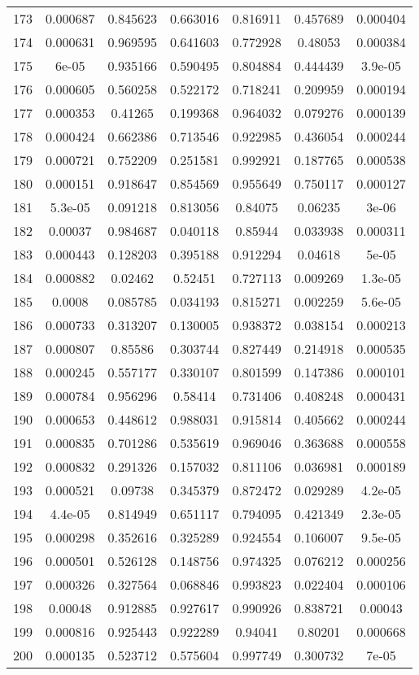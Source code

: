 \begin{table}
\begin{tabular}{c|c|c|c|c|c|c}
173 & 0.000687 & 0.845623 & 0.663016 & 0.816911 & 0.457689 & 0.000404\\
174 & 0.000631 & 0.969595 & 0.641603 & 0.772928 & 0.48053 & 0.000384\\
175 & 6e-05 & 0.935166 & 0.590495 & 0.804884 & 0.444439 & 3.9e-05\\
176 & 0.000605 & 0.560258 & 0.522172 & 0.718241 & 0.209959 & 0.000194\\
177 & 0.000353 & 0.41265 & 0.199368 & 0.964032 & 0.079276 & 0.000139\\
178 & 0.000424 & 0.662386 & 0.713546 & 0.922985 & 0.436054 & 0.000244\\
179 & 0.000721 & 0.752209 & 0.251581 & 0.992921 & 0.187765 & 0.000538\\
180 & 0.000151 & 0.918647 & 0.854569 & 0.955649 & 0.750117 & 0.000127\\
181 & 5.3e-05 & 0.091218 & 0.813056 & 0.84075 & 0.06235 & 3e-06\\
182 & 0.00037 & 0.984687 & 0.040118 & 0.85944 & 0.033938 & 0.000311\\
183 & 0.000443 & 0.128203 & 0.395188 & 0.912294 & 0.04618 & 5e-05\\
184 & 0.000882 & 0.02462 & 0.52451 & 0.727113 & 0.009269 & 1.3e-05\\
185 & 0.0008 & 0.085785 & 0.034193 & 0.815271 & 0.002259 & 5.6e-05\\
186 & 0.000733 & 0.313207 & 0.130005 & 0.938372 & 0.038154 & 0.000213\\
187 & 0.000807 & 0.85586 & 0.303744 & 0.827449 & 0.214918 & 0.000535\\
188 & 0.000245 & 0.557177 & 0.330107 & 0.801599 & 0.147386 & 0.000101\\
189 & 0.000784 & 0.956296 & 0.58414 & 0.731406 & 0.408248 & 0.000431\\
190 & 0.000653 & 0.448612 & 0.988031 & 0.915814 & 0.405662 & 0.000244\\
191 & 0.000835 & 0.701286 & 0.535619 & 0.969046 & 0.363688 & 0.000558\\
192 & 0.000832 & 0.291326 & 0.157032 & 0.811106 & 0.036981 & 0.000189\\
193 & 0.000521 & 0.09738 & 0.345379 & 0.872472 & 0.029289 & 4.2e-05\\
194 & 4.4e-05 & 0.814949 & 0.651117 & 0.794095 & 0.421349 & 2.3e-05\\
195 & 0.000298 & 0.352616 & 0.325289 & 0.924554 & 0.106007 & 9.5e-05\\
196 & 0.000501 & 0.526128 & 0.148756 & 0.974325 & 0.076212 & 0.000256\\
197 & 0.000326 & 0.327564 & 0.068846 & 0.993823 & 0.022404 & 0.000106\\
198 & 0.00048 & 0.912885 & 0.927617 & 0.990926 & 0.838721 & 0.00043\\
199 & 0.000816 & 0.925443 & 0.922289 & 0.94041 & 0.80201 & 0.000668\\
200 & 0.000135 & 0.523712 & 0.575604 & 0.997749 & 0.300732 & 7e-05\\
\end{tabular}
\end{table}
